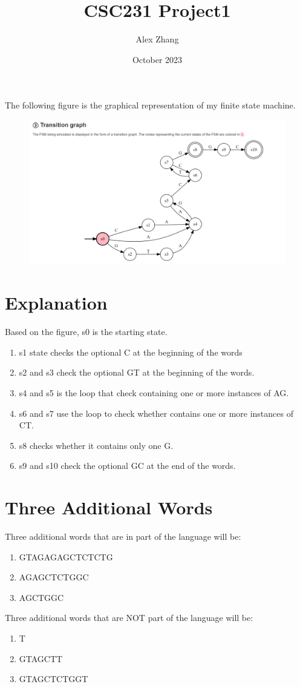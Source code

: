 \documentclass{article}
\title{CSC231 Project1}
\author{Alex Zhang}
\date{October 2023}
\begin{document}
\maketitle
The following figure is the graphical representation of my finite state machine.
\begin{figure}[!ht]
    \begin{center}
        \includegraphics[scale = 0.5]{DFSM.png}
    \end{center}
\end{figure}
\section*{Explanation}
Based on the figure, s0 is the starting state.
\begin{enumerate}
    \item s1 state checks the optional C at the beginning of the words
    \item s2 and s3 check the optional GT at the beginning of the words.
    \item s4 and s5 is the loop that check containing one or more instances of AG.
    \item s6 and s7 use the loop to check whether contains one or more instances of CT.
    \item s8 checks whether it contains only one G.
    \item s9 and s10 check the optional GC at the end of the words.
\end{enumerate}
\section*{Three Additional Words}
Three additional words that are in part of the language will be:
\begin{enumerate}
    \item GTAGAGAGCTCTCTG
    \item AGAGCTCTGGC
    \item AGCTGGC
\end{enumerate}

Three additional words that are NOT part of the language will be:
\begin{enumerate}
    \item T
    \item GTAGCTT
    \item GTAGCTCTGGT
\end{enumerate}
\end{document}
